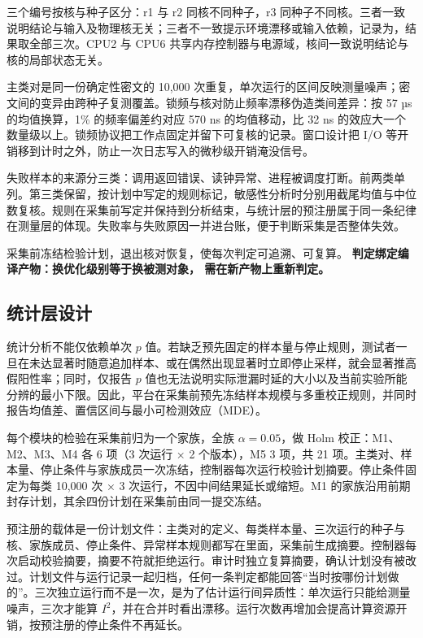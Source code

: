 三个编号按核与种子区分：r1 与 r2 同核不同种子，r3 同种子不同核。三者一致说明结论与输入及物理核无关；三者不一致提示环境漂移或输入依赖，记录为，结果取全部三次。CPU2 与 CPU6 共享内存控制器与电源域，核间一致说明结论与核的局部状态无关。

主类对是同一份确定性密文的 10,000 次重复，单次运行的区间反映测量噪声；密文间的变异由跨种子复测覆盖。锁频与核对防止频率漂移伪造类间差异：按 57 µs 的均值换算，1\% 的频率偏差约对应 570 ns 的均值移动，比 32 ns 的效应大一个数量级以上。锁频协议把工作点固定并留下可复核的记录。窗口设计把 I/O 等开销移到计时之外，防止一次日志写入的微秒级开销淹没信号。

失败样本的来源分三类：调用返回错误、读钟异常、进程被调度打断。前两类单列。第三类保留，按计划中写定的规则标记，敏感性分析时分别用截尾均值与中位数复核。规则在采集前写定并保持到分析结束，与统计层的预注册属于同一条纪律在测量层的体现。失败率与失败原因一并进台账，便于判断采集是否整体失效。

采集前冻结检验计划，退出核对恢复，使每次判定可追溯、可复算。
\textbf{判定绑定编译产物：换优化级别等于换被测对象，
需在新产物上重新判定。}

\subsection{统计层设计}

统计分析不能仅依赖单次 $p$ 值。若缺乏预先固定的样本量与停止规则，测试者一旦在未达显著时随意追加样本、或在偶然出现显著时立即停止采样，就会显著推高假阳性率；同时，仅报告 $p$ 值也无法说明实际泄漏时延的大小以及当前实验所能分辨的最小下限。因此，平台在采集前预先冻结样本规模与多重校正规则，并同时报告均值差、置信区间与最小可检测效应（MDE）。

每个模块的检验在采集前归为一个家族，全族 $\alpha=0.05$，做 Holm 校正：M1、M2、M3、M4 各 6 项（3 次运行 × 2 个版本），M5 3 项，共 21 项。主类对、样本量、停止条件与家族成员一次冻结，控制器每次运行校验计划摘要。停止条件固定为每类 10,000 次 × 3 次运行，不因中间结果延长或缩短。M1 的家族沿用前期封存计划，其余四份计划在采集前由同一提交冻结。

预注册的载体是一份计划文件：主类对的定义、每类样本量、三次运行的种子与核、家族成员、停止条件、异常样本规则都写在里面，采集前生成摘要。控制器每次启动校验摘要，摘要不符就拒绝运行。审计时独立复算摘要，确认计划没有被改过。计划文件与运行记录一起归档，任何一条判定都能回答“当时按哪份计划做的”。三次独立运行而不是一次，是为了估计运行间异质性：单次运行只能给测量噪声，三次才能算 $I^2$，并在合并时看出漂移。运行次数再增加会提高计算资源开销，按预注册的停止条件不再延长。

